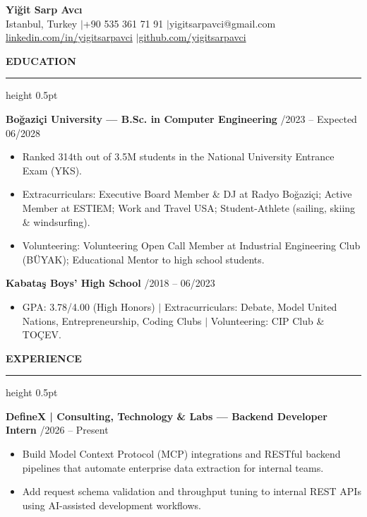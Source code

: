 \documentclass[a4paper]{article}
\newcommand{\sechead}[1]{%
    \vspace{11.0pt}%
    {\fontsize{10.0}{12.0}\textbf{\MakeUppercase{#1}}\par}%
    \vspace{2.4pt}%
    \hrule height 0.5pt%
    \vspace{4.6pt}%
}
\newcommand{\entry}[2]{%
    {\fontsize{9.2}{11.5}\textbf{#1}} \hfill {\fontsize{8.4}{10.6}\selectfont #2} \par
}
\newcommand{\desc}[1]{%
    {\fontsize{8.0}{10.3}\selectfont #1}%
}
\begin{document}

{\centering
    {\fontsize{21}{24}\bfseries Yi\u{g}it Sarp Avc\i{}} \\[0.25em]
    {\fontsize{8.8}{11.2}\selectfont Istanbul, Turkey \enspace$\vert$\enspace +90 535 361 71 91 \enspace$\vert$\enspace yigitsarpavci@gmail.com} \\[0.18em]
    {\fontsize{8.8}{11.2}\selectfont \href{https://linkedin.com/in/yigitsarpavci}{linkedin.com/in/yigitsarpavci} \enspace$\vert$\enspace \href{https://github.com/yigitsarpavci}{github.com/yigitsarpavci}} \par
}
\vspace{0.35em}

\sechead{Education}

\entry{Bo\u{g}azi\c{c}i University \textnormal{--- B.Sc. in Computer Engineering}}{09/2023 -- Expected 06/2028}
\begin{itemize}[leftmargin=1.1em, itemsep=1.2pt, parsep=0pt, topsep=1.2pt]
    \item \desc{Ranked 314th out of 3.5M students in the National University Entrance Exam (YKS).}
    \item \desc{Extracurriculars: Executive Board Member \& DJ at Radyo Bo\u{g}azi\c{c}i; Active Member at ESTIEM; Work and Travel USA; Student-Athlete (sailing, skiing \& windsurfing).}
    \item \desc{Volunteering: Volunteering Open Call Member at Industrial Engineering Club (B\"{U}YAK); Educational Mentor to high school students.}
\end{itemize}
\vspace{5.0pt}

\entry{Kabata\c{s} Boys' High School}{09/2018 -- 06/2023}
\begin{itemize}[leftmargin=1.1em, itemsep=1.2pt, parsep=0pt, topsep=1.2pt]
    \item \desc{GPA: 3.78/4.00 (High Honors) $\vert$ Extracurriculars: Debate, Model United Nations, Entrepreneurship, Coding Clubs $\vert$ Volunteering: CIP Club \& TO\c{C}EV.}
\end{itemize}

\sechead{Experience}

\entry{DefineX | Consulting, Technology \& Labs \textnormal{--- Backend Developer Intern}}{09/2026 -- Present}
\begin{itemize}[leftmargin=1.1em, itemsep=1.2pt, parsep=0pt, topsep=1.2pt]
   \item \desc{Build Model Context Protocol (MCP) integrations and RESTful backend pipelines that automate enterprise data extraction for internal teams.}
   \item \desc{Add request schema validation and throughput tuning to internal REST APIs using AI-assisted development workflows.}
\end{itemize}
\vspace{5.0pt}
\end{document}
